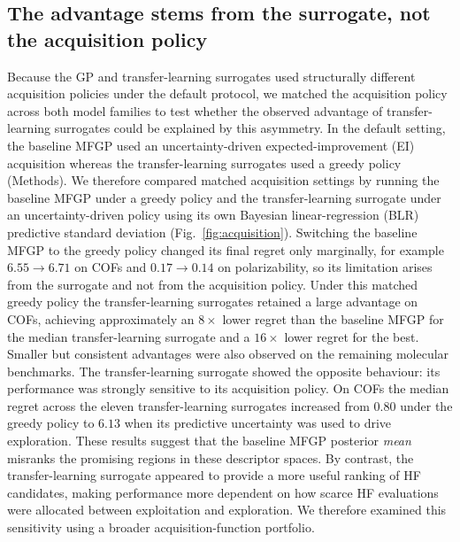 \documentclass[11pt,a4paper]{article}%
\begin{document}
\subsection{The advantage stems from the surrogate, not the acquisition
policy}\label{sec:res-acquisition}

Because the GP and transfer-learning surrogates used structurally different acquisition
policies under the default protocol, we matched the acquisition policy across both model families to test whether
the observed advantage of transfer-learning surrogates could be explained by this asymmetry. In the default setting, the baseline MFGP used an uncertainty-driven expected-improvement (EI) acquisition whereas the transfer-learning surrogates used a greedy policy (Methods). We therefore compared matched acquisition settings by running the baseline MFGP under a greedy policy
and the transfer-learning surrogate under an uncertainty-driven policy using its own Bayesian linear-regression (BLR) predictive
standard deviation (Fig.~\ref{fig:acquisition}). Switching the baseline MFGP to the greedy policy changed its final regret only marginally, for example $6.55 \rightarrow 6.71$ on COFs and $0.17 \rightarrow
0.14$ on polarizability, so its limitation arises from the surrogate and not from the acquisition policy. Under this matched greedy policy the transfer-learning surrogates retained
a large advantage on COFs, achieving approximately an $8\times$ lower regret than the baseline MFGP for the median transfer-learning surrogate and a $16\times$ lower regret for the
best. Smaller but consistent advantages were also observed on the remaining molecular benchmarks. The transfer-learning
surrogate showed the opposite behaviour: its performance was strongly sensitive to its acquisition policy. On COFs the median regret across the eleven transfer-learning surrogates
increased from $0.80$ under the greedy policy to $6.13$ when its predictive uncertainty was used to drive
exploration.
These results suggest that the baseline MFGP
posterior \emph{mean} misranks the promising regions in these descriptor spaces. By contrast, the transfer-learning surrogate appeared to provide a more useful ranking of HF candidates, making performance more dependent on how scarce HF
evaluations were allocated between exploitation and exploration. We therefore examined this sensitivity using a broader acquisition-function portfolio.
\end{document}
